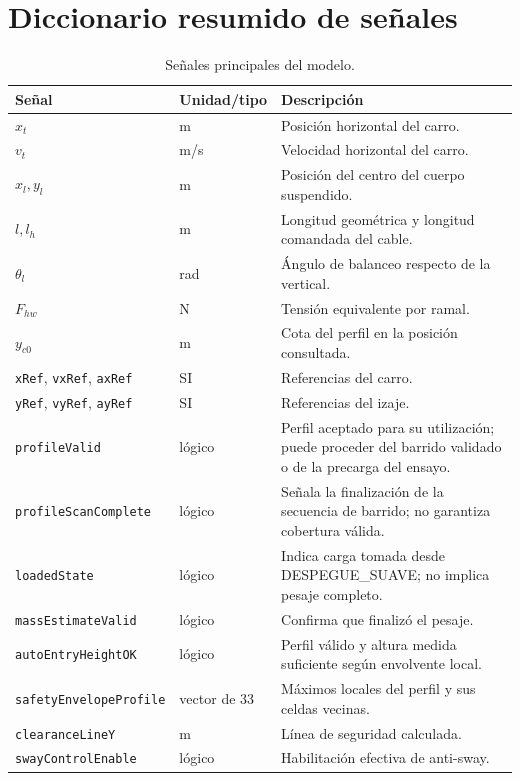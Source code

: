 \documentclass[a4paper,10pt,onecolumn,journal]{ieeeconf}
\numberwithin{equation}{section}
\renewcommand{\arraystretch}{1.35}
\begin{document}
\section{Diccionario resumido de señales}
{\small
\renewcommand{\arraystretch}{1.10}
\begin{table}[H]
\centering
\caption{Señales principales del modelo.}
\begin{tabular}{L{4.3cm} L{2.4cm} L{7.0cm}}
\toprule
Señal & Unidad/tipo & Descripción\\
\midrule
$x_t$ & m & Posición horizontal del carro.\\
$v_t$ & m/s & Velocidad horizontal del carro.\\
$x_l,y_l$ & m & Posición del centro del cuerpo suspendido.\\
$l,l_h$ & m & Longitud geométrica y longitud comandada del cable.\\
$\theta_l$ & rad & Ángulo de balanceo respecto de la vertical.\\
$F_{hw}$ & N & Tensión equivalente por ramal.\\
$y_{c0}$ & m & Cota del perfil en la posición consultada.\\
\texttt{xRef}, \texttt{vxRef}, \texttt{axRef} & SI & Referencias del carro.\\
\texttt{yRef}, \texttt{vyRef}, \texttt{ayRef} & SI & Referencias del izaje.\\
\texttt{profileValid} & lógico & Perfil aceptado para su utilización; puede proceder del barrido validado o de la precarga del ensayo.\\
\texttt{profileScan}\newline\texttt{Complete} & lógico & Señala la finalización de la secuencia de barrido; no garantiza cobertura válida.\\
\texttt{loadedState} & lógico & Indica carga tomada desde DESPEGUE\_SUAVE; no implica pesaje completo.\\
\texttt{massEstimateValid} & lógico & Confirma que finalizó el pesaje.\\
\texttt{autoEntryHeightOK} & lógico & Perfil válido y altura medida suficiente según envolvente local.\\
\texttt{safetyEnvelope}\newline\texttt{Profile} & vector de 33 & Máximos locales del perfil y sus celdas vecinas.\\
\texttt{clearanceLineY} & m & Línea de seguridad calculada.\\
\texttt{swayControlEnable} & lógico & Habilitación efectiva de anti-sway.\\

\end{tabular}
\end{table}}
\end{document}
